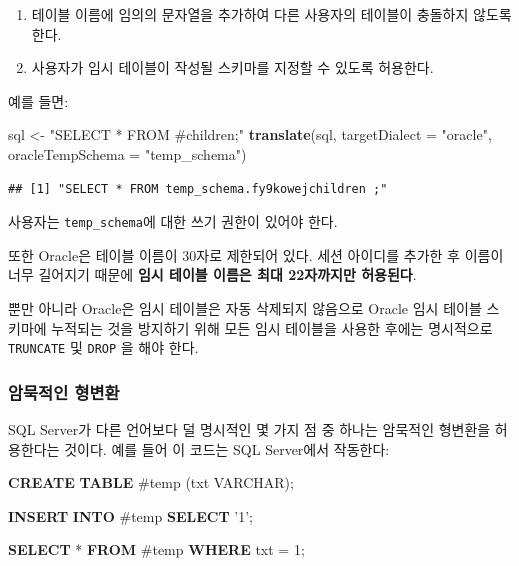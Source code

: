 \documentclass[11pt]{book}
\newenvironment{Shaded}{\begin{snugshade}}{\end{snugshade}}
\newcommand{\KeywordTok}[1]{\textcolor[rgb]{0.13,0.29,0.53}{\textbf{#1}}}
\newcommand{\DataTypeTok}[1]{\textcolor[rgb]{0.13,0.29,0.53}{#1}}
\newcommand{\DecValTok}[1]{\textcolor[rgb]{0.00,0.00,0.81}{#1}}
\newcommand{\StringTok}[1]{\textcolor[rgb]{0.31,0.60,0.02}{#1}}
\newcommand{\NormalTok}[1]{#1}
\providecommand{\tightlist}{%
  \setlength{\itemsep}{0pt}\setlength{\parskip}{0pt}}
\theoremstyle{definition}
\theoremstyle{definition}
\theoremstyle{definition}
\theoremstyle{remark}
\begin{document}
\begin{enumerate}
\def\labelenumi{\arabic{enumi}.}
\tightlist
\item
  테이블 이름에 임의의 문자열을 추가하여 다른 사용자의 테이블이 충돌하지
  않도록 한다.
\item
  사용자가 임시 테이블이 작성될 스키마를 지정할 수 있도록 허용한다.
\end{enumerate}

예를 들면:

\begin{Shaded}
\begin{Highlighting}[]
\NormalTok{sql <-}\StringTok{ "SELECT * FROM #children;"}
\KeywordTok{translate}\NormalTok{(sql, }\DataTypeTok{targetDialect =} \StringTok{"oracle"}\NormalTok{, }\DataTypeTok{oracleTempSchema =} \StringTok{"temp_schema"}\NormalTok{)}
\end{Highlighting}
\end{Shaded}

\begin{verbatim}
## [1] "SELECT * FROM temp_schema.fy9kowejchildren ;"
\end{verbatim}

사용자는 \texttt{temp\_schema}에 대한 쓰기 권한이 있어야 한다.

또한 Oracle은 테이블 이름이 30자로 제한되어 있다. 세션 아이디를 추가한
후 이름이 너무 길어지기 때문에 \textbf{임시 테이블 이름은 최대
22자까지만 허용된다}.

뿐만 아니라 Oracle은 임시 테이블은 자동 삭제되지 않음으로 Oracle 임시
테이블 스키마에 누적되는 것을 방지하기 위해 모든 임시 테이블을 사용한
후에는 명시적으로 \texttt{TRUNCATE} 및 \texttt{DROP} 을 해야 한다.

\subsubsection*{암묵적인 형변환}\label{-}

SQL Server가 다른 언어보다 덜 명시적인 몇 가지 점 중 하나는 암묵적인
형변환을 허용한다는 것이다. 예를 들어 이 코드는 SQL Server에서 작동한다:

\begin{Shaded}
\begin{Highlighting}[]
\KeywordTok{CREATE} \KeywordTok{TABLE}\NormalTok{ #temp (txt }\DataTypeTok{VARCHAR}\NormalTok{);}

\KeywordTok{INSERT} \KeywordTok{INTO}\NormalTok{ #temp}
\KeywordTok{SELECT} \StringTok{'1'}\NormalTok{;}

\KeywordTok{SELECT}\NormalTok{ * }\KeywordTok{FROM}\NormalTok{ #temp }\KeywordTok{WHERE}\NormalTok{ txt = }\DecValTok{1}\NormalTok{;}
\end{Highlighting}
\end{Shaded}
\end{document}
